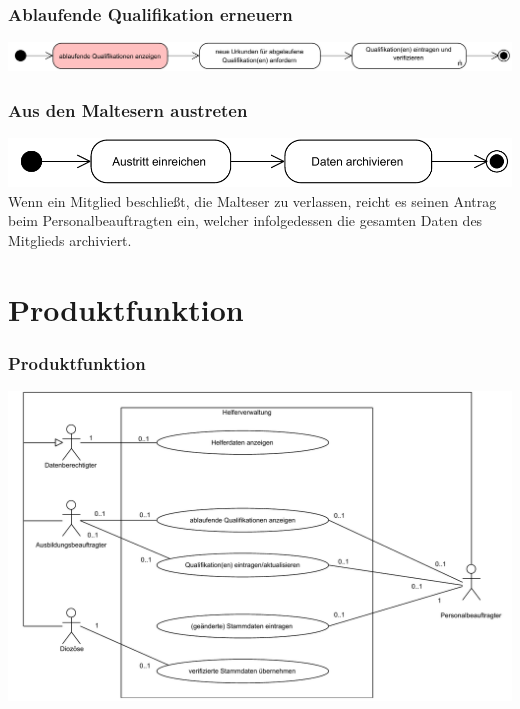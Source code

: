 \documentclass{beamer}
\begin{document}
\begin{frame}
\frametitle{Ablaufende Qualifikation erneuern}
\includegraphics[width=\textwidth]{PDF/BusinessP/Qualifikation_erneuern.pdf}
\end{frame}

\begin{frame}
\frametitle{Aus den Maltesern austreten}
\includegraphics[width=\textwidth]{PDF/BusinessP/Austreten.pdf}
Wenn ein Mitglied beschließt, die Malteser zu verlassen, reicht es seinen Antrag beim Personalbeauftragten ein, welcher infolgedessen die gesamten Daten des Mitglieds archiviert.
\end{frame}


\section{Produktfunktion}		
\begin{frame}
\frametitle{Produktfunktion}
\includegraphics[height=0.75 \textheight]{PDF/Use_Case.pdf}
\end{frame}
\end{document}
